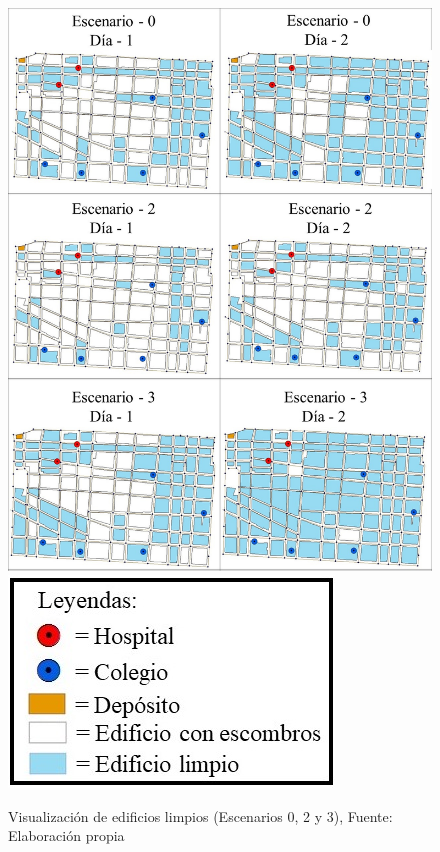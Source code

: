 \documentclass[letterpaper,conference]{IEEEtran}
\begin{document}
\begin{figure}[h!]
\centering
\includegraphics[scale=0.26]{Figuras/visu3.jpg} 
\includegraphics[scale=0.45]{Figuras/simb2.jpg} 
\caption{Visualización de edificios limpios  (Escenarios 0, 2 y 3), Fuente: Elaboración propia}
\label{fig:esc023-visu}
\end{figure}
	
\end{document}

